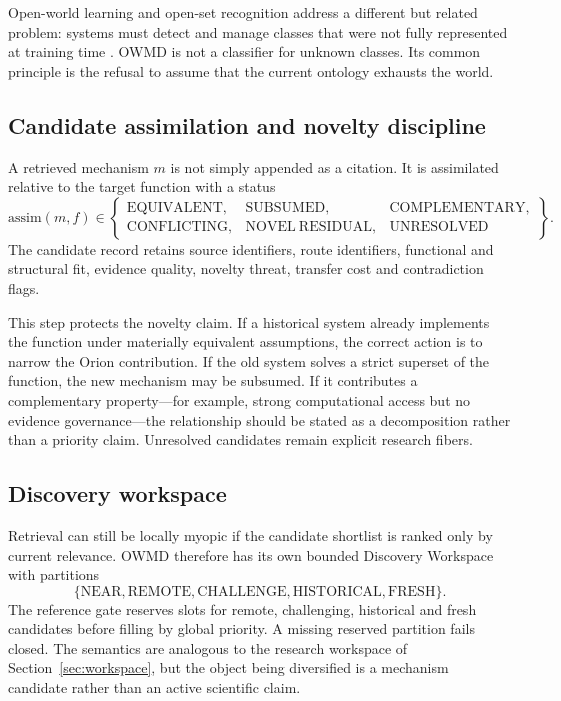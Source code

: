 Open-world learning and open-set recognition address a different but related problem: systems must detect and manage classes that were not fully represented at training time \cite{jafarzadeh2021}. OWMD is not a classifier for unknown classes. Its common principle is the refusal to assume that the current ontology exhausts the world.

\subsection{Candidate assimilation and novelty discipline}

A retrieved mechanism \(m\) is not simply appended as a citation. It is assimilated relative to the target function with a status
\[
\mathrm{assim}(m,f)\in
\left\{
\begin{array}{lll}
\mathrm{EQUIVALENT}, & \mathrm{SUBSUMED}, & \mathrm{COMPLEMENTARY},\\
\mathrm{CONFLICTING}, & \mathrm{NOVEL\ RESIDUAL}, & \mathrm{UNRESOLVED}
\end{array}
\right\}.
\]
The candidate record retains source identifiers, route identifiers, functional and structural fit, evidence quality, novelty threat, transfer cost and contradiction flags.

This step protects the novelty claim. If a historical system already implements the function under materially equivalent assumptions, the correct action is to narrow the Orion contribution. If the old system solves a strict superset of the function, the new mechanism may be subsumed. If it contributes a complementary property---for example, strong computational access but no evidence governance---the relationship should be stated as a decomposition rather than a priority claim. Unresolved candidates remain explicit research fibers.

\subsection{Discovery workspace}

Retrieval can still be locally myopic if the candidate shortlist is ranked only by current relevance. OWMD therefore has its own bounded Discovery Workspace with partitions
\[
\{\mathrm{NEAR},\mathrm{REMOTE},\mathrm{CHALLENGE},\mathrm{HISTORICAL},\mathrm{FRESH}\}.
\]
The reference gate reserves slots for remote, challenging, historical and fresh candidates before filling by global priority. A missing reserved partition fails closed. The semantics are analogous to the research workspace of Section~\ref{sec:workspace}, but the object being diversified is a mechanism candidate rather than an active scientific claim.

